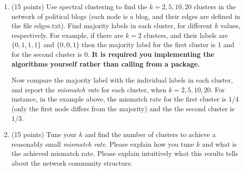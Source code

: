 \documentclass[twoside,10pt]{article}
\begin{document}
\begin{enumerate}

\item (15 points) Use spectral clustering to find the $k = 2, 5, 10, 20$ clusters in the network of political blogs (each node is a blog, and their edges are defined in the file \textsf{edges.txt}). Find majority labels in each cluster, for different $k$ values, respectively. For example, if there are $k = 2$ clusters, and their labels are $\{0, 1, 1, 1\}$ and $\{0, 0, 1\}$ then the majority label for the first cluster is 1 and for the second cluster is 0. {\bf It is required you implementing the algorithms yourself rather than calling from a package.} 

Now compare the majority label with the individual labels in each cluster, and report the {\it mismatch rate} for each cluster, when $k = 2, 5, 10, 20$. For instance, in the example above, the mismatch rate for the first cluster is 1/4 (only the first node differs from the majority) and the the second cluster is 1/3. 

\item (15  points) Tune your $k$ and find the number of clusters to achieve a reasonably small {\it mismatch rate}. Please explain how you tune $k$ and what is the achieved mismatch rate. Please explain intuitively what this results tells about the network community structure.

\end{enumerate}
\end{document}
